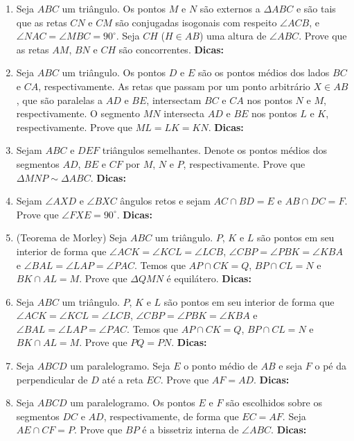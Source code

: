 \documentclass{article}
\newcommand{\dica}{\textbf{Dicas:}}
\newcommand{\iniTri}{Seja $ABC$ um triângulo}
\begin{document}
\begin{multicols}{2}
\begin{enumerate}
    \item \iniTri. Os pontos $M$ e $N$ são externos a $\Delta ABC$ e são tais que as retas $CN$ e $CM$ são conjugadas isogonais com respeito $\angle ACB$, e $\angle NAC=\angle MBC=90^{\circ}$. Seja $CH$ ($H\in AB$) uma altura de $\angle ABC$. Prove que as retas $AM$, $BN$ e $CH$ são concorrentes. \dica %
    
    \item \iniTri. Os pontos $D$ e $E$ são os pontos médios dos lados $BC$ e $CA$, respectivamente. As retas que passam por um ponto arbitrário $X\in AB$, que são paralelas a $AD$ e $BE$, intersectam $BC$ e $CA$ nos pontos $N$ e $M$, respectivamente. O segmento $MN$ intersecta $AD$ e $BE$ nos pontos $L$ e $K$, respectivamente. Prove que $ML=LK=KN$. \dica %
    
    \item Sejam $ABC$ e $DEF$ triângulos semelhantes. Denote os pontos médios dos segmentos $AD$, $BE$ e $CF$ por $M$, $N$ e $P$, respectivamente. Prove que $\Delta MNP\sim \Delta ABC$. \dica %
    
    \item Sejam $\angle AXD$ e $\angle BXC$ ângulos retos e sejam $AC\cap BD=E$ e $AB\cap DC=F$. Prove que $\angle FXE=90^{\circ}$. \dica %
    
    \item (Teorema de Morley) \iniTri. $P$, $K$ e $L$ são pontos em seu interior de forma que $\angle ACK=\angle KCL=\angle LCB$, $\angle CBP=\angle PBK=\angle KBA$ e $\angle BAL=\angle LAP=\angle PAC$. Temos que $AP\cap CK=Q$, $BP\cap CL=N$ e $BK\cap AL=M$. Prove que $\Delta QMN$ é equilátero. \dica %
    
    \item \iniTri. $P$, $K$ e $L$ são pontos em seu interior de forma que $\angle ACK=\angle KCL=\angle LCB$, $\angle CBP=\angle PBK=\angle KBA$ e $\angle BAL=\angle LAP=\angle PAC$. Temos que $AP\cap CK=Q$, $BP\cap CL=N$ e $BK\cap AL=M$. Prove que $PQ=PN$. \dica %
    
    \item Seja $ABCD$ um paralelogramo. Seja $E$ o ponto médio de $AB$ e seja $F$ o pé da perpendicular de $D$ até a reta $EC$. Prove que $AF=AD$. \dica %
    
    \item Seja $ABCD$ um paralelogramo. Os pontos $E$ e $F$ são escolhidos sobre os segmentos $DC$ e $AD$, respectivamente, de forma que $EC=AF$. Seja $AE\cap CF=P$. Prove que $BP$ é a bissetriz interna de $\angle ABC$. \dica %
    

\end{enumerate}
\end{multicols}
\end{document}
